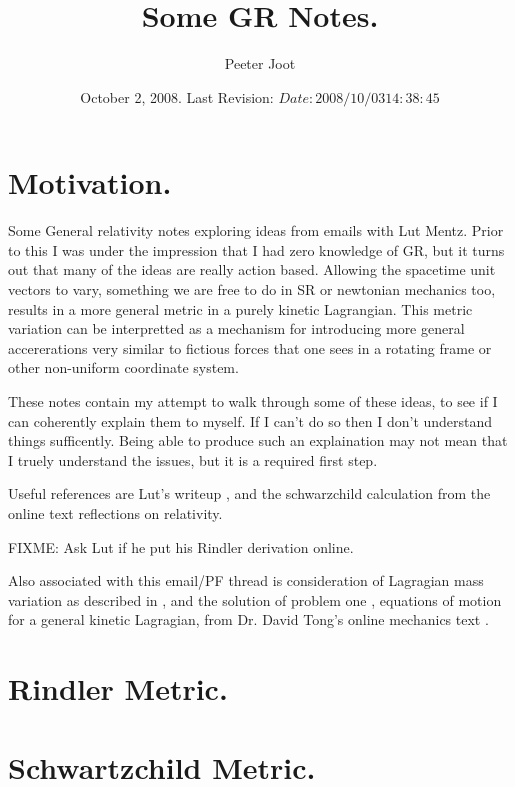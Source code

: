 \documentclass{article}      %
\title{ Some GR Notes. } %
\author{Peeter Joot}         %
\date{ October 2, 2008.  Last Revision: $Date: 2008/10/03 14:38:45 $ } %
\begin{document}

\maketitle{}

\tableofcontents

\section{ Motivation. }

Some General relativity notes exploring ideas from emails with Lut Mentz.
Prior to this I was under the impression that I had zero knowledge of GR,
but it turns out that many of the ideas are really action based. 
Allowing the spacetime unit vectors to vary, something we are free to
do in SR or newtonian mechanics too, results in a more 
general metric in a purely kinetic Lagrangian.  This metric variation
can be interpretted as a mechanism for introducing more general
accererations very similar to fictious forces that one sees in a
rotating frame or other non-uniform coordinate system.

These notes contain my attempt to walk through some of these ideas, to see
if I can coherently explain them to myself.  If I can't do so then I don't
understand things sufficently.  Being able to produce such an explaination
may not mean that I truely understand the issues, but it is a required
first step.

Useful references are Lut's writeup \cite{lutSchwarzChildRadial}, 
and the schwarzchild calculation \cite{mathpagesSchwarzChildRadial}
from the online text reflections on relativity.

FIXME: Ask Lut if he put his Rindler derivation online.

Also associated with this email/PF thread is consideration
of Lagragian mass variation as described in \cite{PJMassVary}, and
the solution of problem one \cite{PJTongMf1}, equations of motion for
a general kinetic Lagragian, from Dr. David Tong's online mechanics text
\cite{TongDynamics}.

\section{ Rindler Metric. }

\section{ Schwartzchild Metric. } 
\end{document}
